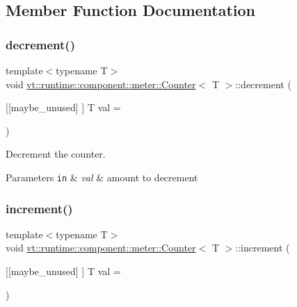 \subsection{Member Function Documentation}
\mbox{\label{structvt_1_1runtime_1_1component_1_1meter_1_1_counter_a0b288a8858de5a1df69c08be59e81a74}} 
\subsubsection{\texorpdfstring{decrement()}{decrement()}}
{\footnotesize\ttfamily template$<$typename T$>$ \\
void \hyperlink{structvt_1_1runtime_1_1component_1_1meter_1_1_counter}{vt\+::runtime\+::component\+::meter\+::\+Counter}$<$ T $>$\+::decrement (\begin{DoxyParamCaption}\item[{\mbox{[}\mbox{[}maybe\+\_\+unused\mbox{]} \mbox{]} T}]{val = {} }\end{DoxyParamCaption})\hspace{0.3cm}{\ttfamily [inline]}}



Decrement the counter. 


\begin{DoxyParams}[1]{Parameters}
\mbox{\tt in}  & {\em val} & amount to decrement \\
\hline
\end{DoxyParams}
\mbox{\label{structvt_1_1runtime_1_1component_1_1meter_1_1_counter_a72800a7f697ea3bcc52b565d8e6bc35e}} 
\subsubsection{\texorpdfstring{increment()}{increment()}}
{\footnotesize\ttfamily template$<$typename T$>$ \\
void \hyperlink{structvt_1_1runtime_1_1component_1_1meter_1_1_counter}{vt\+::runtime\+::component\+::meter\+::\+Counter}$<$ T $>$\+::increment (\begin{DoxyParamCaption}\item[{\mbox{[}\mbox{[}maybe\+\_\+unused\mbox{]} \mbox{]} T}]{val = {} }\end{DoxyParamCaption})\hspace{0.3cm}{\ttfamily [inline]}}



